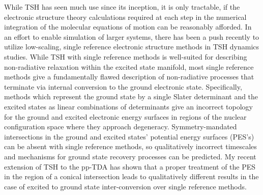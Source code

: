 \documentclass[12pt]{article}
\begin{document}
While TSH has seen much use since its inception, it is only tractable, if the
electronic structure theory calculations required at each step in the numerical
integration of the molecular equations of motion  can be reasonably afforded.  In an
effort to enable simulation of larger systems, there has been a push recently to
utilize low-scaling, single reference electronic structure methods in TSH
dynamics studies.\cite{Lan15_1360,Rothlisberger07_023001,Li16_935} While TSH
with single reference  methods is well-suited for describing non-radiative
relaxation within the excited state
manifold\cite{Subotnik14_4253,Barbatti14_1395}, most single reference  methods
give a fundamentally flawed description of non-radiative processes that
terminate via internal conversion to the ground electronic state.  Specifically,
methods which represent the ground state by a single Slater determinant and the
excited states as linear combinations of determinants give an incorrect topology
for the ground and excited electronic energy surfaces in regions of the nuclear
configuration space where they approach degeneracy.\cite{Massimo14_3074,
Martinez06_1039} Symmetry-mandated intersections in the ground and excited
states' potential energy surfaces (PES's) can be absent with single reference
methods, so qualitatively incorrect timescales and mechanisms for ground state
recovery processes  can be predicted.  My recent extension of TSH to the pp-TDA
\cite{DBWY16_Submitted1} has shown that a proper treatment of the PES in the
region of a conical intersection leads to qualitatively different results in
the case of excited to ground state inter-conversion over single reference
methods.
\end{document}
